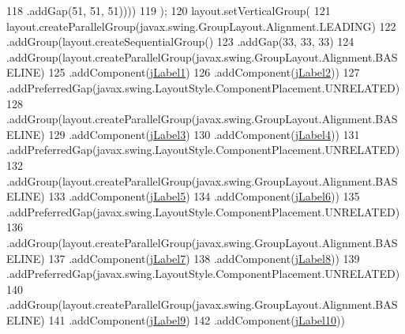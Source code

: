\begin{DoxyCode}
118                         .addGap(51, 51, 51))))
119         );
120         layout.setVerticalGroup(
121             layout.createParallelGroup(javax.swing.GroupLayout.Alignment.LEADING)
122             .addGroup(layout.createSequentialGroup()
123                 .addGap(33, 33, 33)
124                 .addGroup(layout.createParallelGroup(javax.swing.GroupLayout.Alignment.BASELINE)
125                     .addComponent(\mbox{\hyperlink{class_interfaz_package_1_1_informacion_cliente_a76d63040cd29ebdaf61bb51a1f748393}{jLabel1}})
126                     .addComponent(\mbox{\hyperlink{class_interfaz_package_1_1_informacion_cliente_a1ff1b1422342b4b51d17fb166ec625ff}{jLabel2}}))
127                 .addPreferredGap(javax.swing.LayoutStyle.ComponentPlacement.UNRELATED)
128                 .addGroup(layout.createParallelGroup(javax.swing.GroupLayout.Alignment.BASELINE)
129                     .addComponent(\mbox{\hyperlink{class_interfaz_package_1_1_informacion_cliente_affc4d391ce9a4a138bb4ea1fc2fc23ec}{jLabel3}})
130                     .addComponent(\mbox{\hyperlink{class_interfaz_package_1_1_informacion_cliente_aa0124c463f35b5a5caaf6987b4329799}{jLabel4}}))
131                 .addPreferredGap(javax.swing.LayoutStyle.ComponentPlacement.UNRELATED)
132                 .addGroup(layout.createParallelGroup(javax.swing.GroupLayout.Alignment.BASELINE)
133                     .addComponent(\mbox{\hyperlink{class_interfaz_package_1_1_informacion_cliente_a12ceb5a1b4c467dfa98d98325d8ef848}{jLabel5}})
134                     .addComponent(\mbox{\hyperlink{class_interfaz_package_1_1_informacion_cliente_a821aa89fbcb7dfaebf2fadaa9afe79e6}{jLabel6}}))
135                 .addPreferredGap(javax.swing.LayoutStyle.ComponentPlacement.UNRELATED)
136                 .addGroup(layout.createParallelGroup(javax.swing.GroupLayout.Alignment.BASELINE)
137                     .addComponent(\mbox{\hyperlink{class_interfaz_package_1_1_informacion_cliente_a43ed96cf07f28a71b91c6825e13023c3}{jLabel7}})
138                     .addComponent(\mbox{\hyperlink{class_interfaz_package_1_1_informacion_cliente_acafa312ca1d5f92c4d3f969e1879289b}{jLabel8}}))
139                 .addPreferredGap(javax.swing.LayoutStyle.ComponentPlacement.UNRELATED)
140                 .addGroup(layout.createParallelGroup(javax.swing.GroupLayout.Alignment.BASELINE)
141                     .addComponent(\mbox{\hyperlink{class_interfaz_package_1_1_informacion_cliente_a03808e144608db738a13ec9eaa6d5559}{jLabel9}})
142                     .addComponent(\mbox{\hyperlink{class_interfaz_package_1_1_informacion_cliente_af5593b23fec083a2c1f0cfccfb17b2ad}{jLabel10}}))

\end{DoxyCode}
